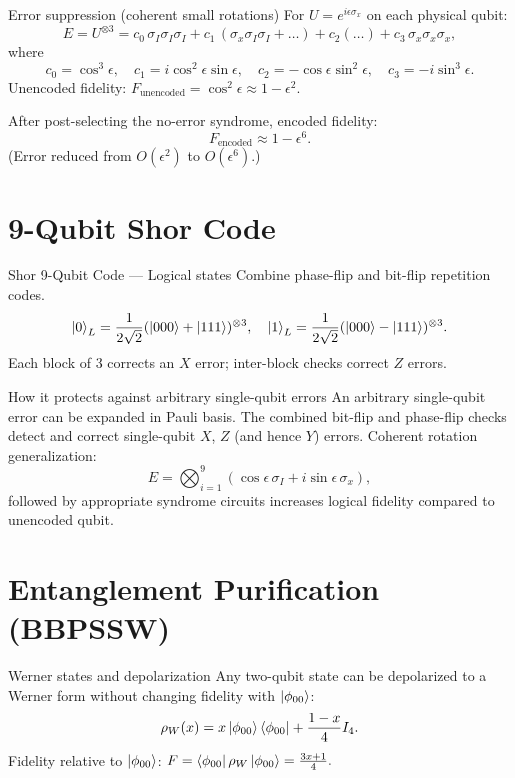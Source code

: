 \documentclass[10pt]{beamer}
\begin{document}
\begin{frame}{Error suppression (coherent small rotations)}
  For \(U=e^{i\epsilon \sigma_x}\) on each physical qubit:
  \[
    E = U^{\otimes 3} = c_0\,\sigma_I\sigma_I\sigma_I
      + c_1\,(\sigma_x\sigma_I\sigma_I + \dots) + c_2(\dots) + c_3\,\sigma_x\sigma_x\sigma_x,
  \]
  where
  \[
    c_0=\cos^3\epsilon,\quad c_1=i\cos^2\epsilon\sin\epsilon,\quad c_2=-\cos\epsilon\sin^2\epsilon,\quad c_3=-i\sin^3\epsilon.
  \]
  Unencoded fidelity: \(F_{\text{unencoded}}=\cos^2\epsilon\approx 1-\epsilon^2\).
  
  After post-selecting the no-error syndrome, encoded fidelity:
  \[
    F_{\text{encoded}}\approx 1-\epsilon^6.
  \]
  (Error reduced from \(O(\epsilon^2)\) to \(O(\epsilon^6)\).)
\end{frame}

\section{9-Qubit Shor Code}
\begin{frame}{Shor 9-Qubit Code — Logical states}
  Combine phase-flip and bit-flip repetition codes.
  \[
    \ket{0}_L = \frac{1}{2\sqrt{2}} ( \ket{000}+\ket{111} )^{\otimes 3},\quad
    \ket{1}_L = \frac{1}{2\sqrt{2}} ( \ket{000}-\ket{111} )^{\otimes 3}.
  \]
  Each block of 3 corrects an \(X\) error; inter-block checks correct \(Z\) errors.
\end{frame}

\begin{frame}{How it protects against arbitrary single-qubit errors}
  An arbitrary single-qubit error can be expanded in Pauli basis.
  The combined bit-flip and phase-flip checks detect and correct single-qubit \(X\), \(Z\) (and hence \(Y\)) errors.
  Coherent rotation generalization:
  \[
    E=\bigotimes_{i=1}^{9}(\cos\epsilon\,\sigma_I + i\sin\epsilon\,\sigma_x),
  \]
  followed by appropriate syndrome circuits increases logical fidelity compared to unencoded qubit.
\end{frame}

\section{Entanglement Purification (BBPSSW)}
\begin{frame}{Werner states and depolarization}
  Any two-qubit state can be depolarized to a Werner form without changing fidelity with \(\ket{\phi_{00}}\):
  \[
    \rho_W(x)= x\ket{\phi_{00}}\bra{\phi_{00}} + \frac{1-x}{4} I_4.
  \]
  Fidelity relative to \(\ket{\phi_{00}}\): \(F=\bra{\phi_{00}}\rho_W\ket{\phi_{00}}=\frac{3x+1}{4}.\)
\end{frame}
\end{document}
